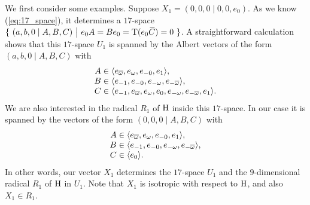 We first consider some examples. Suppose $X_1 = (0,0,0\mid 0,0,e_0)$. As we know (\ref{eq:17_space}), 
it determines 
a $17$-space $	\{\ (a,b,0 \mid A,B,C)\ \big|\ e_0 A = B e_0 = \operatorname{T}(e_0 \mathord{\mbox{\hspace*{0pt}}\,\overline{\!C\!\!\;}\!\:}\mbox{\hspace*{0pt}}) = 0\ \}$. A
straightforward calculation shows that
this $17$-space $U_1$ is spanned by the Albert vectors of the form \mbox{$(a,b,0\mid A,B,C)$} with
\begin{equation}
	\begin{array}{r@{\;}c@{\;}l}
		A & \in & \langle e_{\bar{\omega}}, e_{\omega}, e_{-0}, e_1 \rangle, \\
		B & \in & \langle e_{-1}, e_{-0}, e_{-\omega}, e_{-\bar{\omega}} \rangle, \\
		C & \in & \langle e_{-1}, e_{\bar{\omega}}, e_{\omega}, e_0, e_{-\omega}, e_{-\bar{\omega}}, e_1
		\rangle.
	\end{array}
\end{equation}
We are also interested in the radical $R_1$ of $\mathrm{H}$ inside this $17$-space. In our case it is spanned
by the vectors of the form \mbox{$(0,0,0\mid A,B,C)$} with
\begin{equation}
	\begin{array}{r@{\;}c@{\;}l}
		A & \in & \langle e_{\bar{\omega}}, e_{\omega}, e_{-0}, e_1 \rangle, \\
		B & \in & \langle e_{-1}, e_{-0}, e_{-\omega}, e_{-\bar{\omega}} \rangle, \\
		C & \in & \langle e_0 \rangle.
	\end{array}
\end{equation}
In other words, our vector $X_1$ determines the $17$-space $U_1$ and the $9$-dimensional radical $R_1$ 
of $\mathrm{H}$ in $U_1$. Note that $X_1$ is isotropic with respect to $\mathrm{H}$, and also $X_1 \in R_1$. 

